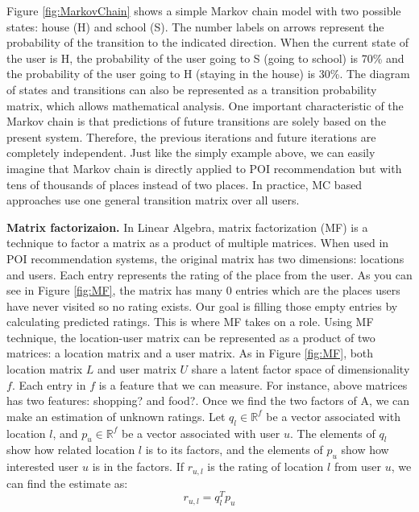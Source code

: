 \documentclass{sig-alternate}
\begin{document}
Figure \ref{fig:MarkovChain} shows a simple Markov chain 
model with two possible states: house (H) and school (S). The number labels on arrows represent 
the probability of the transition to the indicated direction. When the current state of the 
user is H, the probability of the user going to S (going to school) is 70\% and the probability of the 
user going to H (staying in the house) is 30\%. The diagram of states and transitions can also be 
represented as a transition probability matrix, which allows mathematical analysis. One important 
characteristic of the Markov chain is that predictions of future transitions are solely based on the present 
system. Therefore, the previous iterations and future iterations are completely independent. 
Just like the simply example above, we can easily imagine that Markov chain is directly applied to 
POI recommendation but with tens of thousands of places instead of two places. In practice, MC based 
approaches use one general transition matrix over all users. 

\textbf{Matrix factorizaion.} In Linear Algebra, matrix factorization (MF) is a technique to 
factor a matrix as a product of multiple matrices. When used in POI recommendation systems, 
the original matrix has two dimensions: locations and users. Each entry represents the rating of 
the place from the user. As you can see in Figure \ref{fig:MF}, the matrix
has many 0 entries which are the places users have never visited so no rating exists. 
Our goal is filling those empty entries by calculating predicted ratings. This is where MF takes on
a role. Using MF technique, the location-user matrix can be represented as a product of two matrices: 
a location matrix and a user matrix. As in Figure \ref{fig:MF}, both location matrix $L$ and user matrix $U$ share 
a latent factor space of dimensionality $f$. Each entry in $f$ is a feature that we can measure.
For instance, above matrices has two features: shopping? and food?. Once we find the two 
factors of A, we can make an estimation of unknown ratings. Let $q_l \in \mathbb{R}^f$ be a vector associated with location $l$, and 
$p_u \in \mathbb{R}^f$ be a vector associated with user $u$. The elements of $q_l$ show how related location $l$ is to its factors, 
and the elements of $p_u$ show how interested user $u$ is in the factors. If $r_{u,l}$ is the rating of location $l$ 
from user $u$, we can find the estimate as:
\begin{equation}
	r_{u,l}= q_l^T p_u
\label{eq:MF}
\end{equation}
\end{document}
